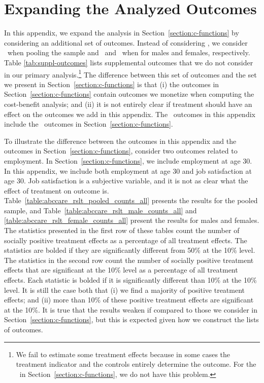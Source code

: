 \section{{Expanding the Analyzed Outcomes}} \label{appendix:moreoutcomes}

\noindent In this appendix, we expand the analysis in Section~\ref{section:c-functions} by considering an additional set of outcomes. Instead of considering \noutcomes, we consider \noutcomesexpp\ when pooling the sample and \noutcomesexpm\ and \noutcomesexpf\ when for males and females, respectively. Table \ref{tab:suppl-outcomes} lists supplemental outcomes that we do not consider in our primary analysis.\footnote{We fail to estimate some treatment effects because in some cases the treatment indicator and the controls entirely determine the outcome. For the \noutcomes\ in Section~\ref{section:c-functions}, we do not have this problem.} The difference between this set of outcomes and the set we present in Section~\ref{section:c-functions} is that (i) the outcomes in Section~\ref{section:c-functions} contain outcomes we monetize when computing the cost-benefit analysis; and (ii) it is not entirely clear if treatment should have an effect on the outcomes we add in this appendix. The \noutcomesexpp\ outcomes in this appendix include the \noutcomes\ outcomes in Section~\ref{section:c-functions}.\\

\singlespacing

\doublespacing

\noindent To illustrate the difference between the outcomes in this appendix and the outcomes in Section~\ref{section:c-functions}, consider two outcomes related to employment. In Section~\ref{section:c-functions}, we include employment at age 30. In this appendix, we include both employment at age 30 and job satisfaction at age 30. Job satisfaction is a subjective variable, and it is not as clear what the effect of treatment on outcome is.\\

\noindent Table~\ref{table:abccare_rslt_pooled_counts_all} presents the results for the pooled sample, and Table~\ref{table:abccare_rslt_male_counts_all} and \ref{table:abccare_rslt_female_counts_all} present the results for males and females.
The statistics presented in the first row of these tables count the number of socially positive treatment effects as a percentage of all treatment effects. The statistics are bolded if they are significantly different from 50\% at the 10\% level. The statistics in the second row count the	number of socially positive treatment effects that are significant at the 10\% level as a percentage of all treatment effects. Each statistic is bolded if it is significantly different than 10\% at the 10\% level. It is still the case both that (i) we find a majority of positive treatment effects; and (ii) more than 10\% of these positive treatment effects are significant at the 10\%. It is true that the results weaken if compared to those we consider in Section~\ref{section:c-functions}, but this is expected given how we construct the lists of outcomes.

